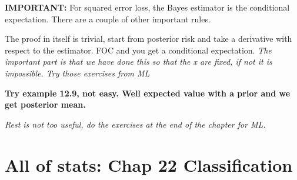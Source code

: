 \documentclass{article}
\begin{document}
\textbf{IMPORTANT:} For squared error loss, the Bayes estimator is the conditional expectation.
There are a couple of other important rules.

The proof in itself is trivial, start from posterior risk and take a derivative with respect to the estimator.
FOC and you get a conditional expectation. \textit{The important part is that we have done this so that the x are fixed, if not it is impossible. Try those exercises from ML}

\textbf{Try example 12.9, not easy. Well expected value with a prior and we get posterior mean.}

\textit{Rest is not too useful, do the exercises at the end of the chapter for ML.}

\section{All of stats: Chap 22 Classification}
\end{document}
